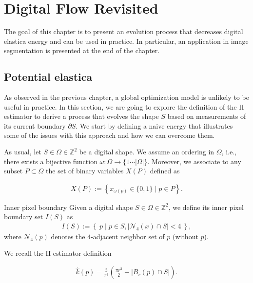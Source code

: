 \chapter{Digital Flow Revisited}
\label{chapter:digital-flow-revisited}

The goal of this chapter is to present an evolution process that decreases digital elastica energy and can be used in practice. In particular, an application in image segmentation is presented at the end of the chapter. 

\section{Potential elastica}

As observed in the previous chapter, a global optimization model is unlikely to be useful in practice. In this section, we are going to explore the definition of the II estimator to derive a process that evolves the shape $S$ based on measurements of its current boundary $\partial S$. We start by defining a naive energy that illustrates some of the issues with this approach and how we can overcome them.

As usual, let $S \in \Omega \in \mathbb{Z}^2$ be a digital shape. We assume an ordering in $\Omega$, i.e., there exists a bijective function $\omega : \Omega \rightarrow \{1 \cdots |\Omega| \}$. Moreover, we associate to any subset $P \subset \Omega$ the set of binary variables $X(P)$ defined as

\begin{align*}
	X(P) := \left\{ x_{\omega(p)} \in \{0,1\} \; | \; p \in P \right\}.
\end{align*}

\begin{definition}{Inner pixel boundary}
Given a digital shape $S \in \Omega \in \mathbb{Z}^2$, we define its inner pixel boundary set $I(S)$ as
\begin{align*}
	I(S) := \left\{ \: p \; | \; p \in S, |\mathcal{N}_4(x) \cap S|<4 \: \right\},
\end{align*}
where $\mathcal{N}_4(p)$ denotes the $4$-adjacent neighbor set of $p$ (without $p$).
\end{definition}


We recall the II estimator definition

\begin{align*}
	\hat{k}(p) = \frac{3}{r^3}\left( \frac{\pi r^2}{2} - |B_r(p) \cap S| \right).
\end{align*}

